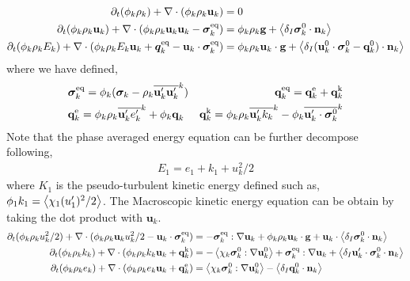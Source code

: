 \begin{align}
    \label{eq:dt_avg_rho}
    \partial_t (\phi_k \rho_k)  
    + \mathbf{\nabla}\cdot (
        \phi_k \rho_k\textbf{u}_k
    )
    &= 
    0\\
    \label{eq:dt_avg_rhou_k}
    \partial_t (\phi_k \rho_k\textbf{u}_k)  
    + \mathbf{\nabla}\cdot (
        \phi_k \rho_k\textbf{u}_k\textbf{u}_k
        - \bm{\sigma}_k^\text{eq}
    )
    &= 
    \phi_k \rho_k \textbf{g} 
    +  \left<\delta_I \bm{\sigma}_k^0 \cdot \textbf{n}_k\right>\\
    \label{eq:dt_avg_rhoE_k}
    \partial_t (\phi_k\rho_kE_k)  
    + \mathbf{\nabla}\cdot (
        \phi_k\rho_kE_k\textbf{u}_k
        + \bm{q}_k^\text{eq}
        - \textbf{u}_k \cdot \bm{\sigma}_k^\text{eq}
        )
    &= 
    \phi_k \rho_k\textbf{u}_k \cdot \textbf{g} 
    + \left<\delta_I (\textbf{u}_k^0 \cdot \bm{\sigma}_k^0 - \textbf{q}_k^0)\cdot \textbf{n}_k\right>
\end{align} 
where we have defined, 
\begin{align*}
    &\bm{\sigma}_k^\text{eq}
    = \phi_k (
        \bm{\sigma}_k%
        - \rho_k\kavg{\textbf{u}_k'\textbf{u}_k'})  
    &\textbf{q}_k^\text{eq}
    =\textbf{q}_k^\text{e} +\textbf{q}_k^\text{k}  \\
    &\textbf{q}_k^\text{e}
    = \phi_k\rho_k \kavg{\textbf{u}_k' e_k'} 
    + \phi_k\textbf{q}_k 
    &\textbf{q}_k^\text{k}
    = \phi_k\rho_k \kavg{\textbf{u}_k' k_k} 
    - \phi_k\kavg{\textbf{u}_k' \cdot \bm{\sigma}_k^0}
\end{align*}
Note that the phase averaged energy equation can be further decompose following, 
\begin{align*}
    E_1 = e_1 + k_1 + u_k^2/2
\end{align*}
where $K_1$ is the pseudo-turbulent kinetic energy defined such as, $\phi_1 k_1 = \left<\chi_1 (u_1')^2/2\right>$. 
The Macroscopic kinetic energy equation can be obtain by taking the dot product with $\textbf{u}_k$. 
\begin{align}
    \partial_t (\phi_k \rho_ku_k^2/2)  
    + \mathbf{\nabla}\cdot (
        \phi_k \rho_k\textbf{u}_ku_k^2/2
        - \textbf{u}_k \cdot \bm{\sigma}_k^\text{eq}
    )
    &= 
    - \bm{\sigma}_k^\text{eq} : \mathbf{\nabla} \textbf{u}_k
    + \phi_k \rho_k \textbf{u}_k\cdot \textbf{g} 
    +  \textbf{u}_k\cdot \left<\delta_I \bm{\sigma}_k^0 \cdot \textbf{n}_k\right>\\
    \partial_t (\phi_k\rho_kk_k)  
    + \mathbf{\nabla}\cdot (
        \phi_k\rho_kk_k\textbf{u}_k
        + \textbf{q}_k^\text{k} 
        )
    &= 
    - \left<\chi_k\bm{\sigma}_k^0 : \mathbf{\nabla} \textbf{u}_k^0\right>
    + \bm{\sigma}_k^\text{eq} : \mathbf{\nabla} \textbf{u}_k
    + \left<\delta_I \textbf{u}_k' \cdot \bm{\sigma}_k^0 \cdot \textbf{n}_k\right>\\
    \partial_t (\phi_k\rho_ke_k)  
    + \mathbf{\nabla}\cdot (
        \phi_k \rho_ke_k\textbf{u}_k
        +
        \textbf{q}_k^\text{e} 
        )
    &= 
    \left<\chi_k\bm{\sigma}_k^0 : \mathbf{\nabla} \textbf{u}_k^0\right>
    - \left<\delta_I \textbf{q}_k^0 \cdot \textbf{n}_k\right> 
\end{align}



